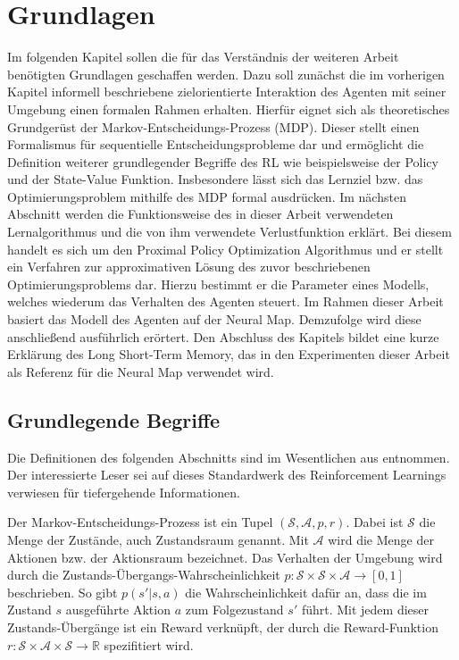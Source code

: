 \chapter{Grundlagen}

Im folgenden Kapitel sollen die für das Verständnis der weiteren Arbeit benötigten Grundlagen geschaffen werden. Dazu soll zunächst die im vorherigen Kapitel informell beschriebene zielorientierte Interaktion des Agenten mit seiner Umgebung einen formalen Rahmen erhalten. Hierfür eignet sich als theoretisches Grundgerüst der Markov-Entscheidungs-Prozess (MDP). Dieser stellt einen Formalismus für sequentielle Entscheidungsprobleme dar und ermöglicht die Definition weiterer grundlegender Begriffe des \ac{RL} wie beispielsweise der Policy und der State-Value Funktion. Insbesondere lässt sich das Lernziel bzw. das Optimierungsproblem mithilfe des MDP formal ausdrücken. Im nächsten Abschnitt werden die Funktionsweise des in dieser Arbeit verwendeten Lernalgorithmus und die von ihm verwendete Verlustfunktion erklärt. Bei diesem handelt es sich um den Proximal Policy Optimization Algorithmus und er stellt ein Verfahren zur approximativen Lösung des zuvor beschriebenen Optimierungsproblems dar. Hierzu bestimmt er die Parameter eines Modells, welches wiederum das Verhalten des Agenten steuert. Im Rahmen dieser Arbeit basiert das Modell des Agenten auf der Neural Map. Demzufolge wird diese anschließend ausführlich erörtert. Den Abschluss des Kapitels bildet eine kurze Erklärung des Long Short-Term Memory, das in den Experimenten dieser Arbeit als Referenz für die Neural Map verwendet wird.


\section{Grundlegende Begriffe}
\label{sec_basics}

Die Definitionen des folgenden Abschnitts sind im Wesentlichen aus \cite{SuttonBarto} entnommen. Der interessierte Leser sei auf dieses Standardwerk des Reinforcement Learnings verwiesen für tiefergehende Informationen.

Der Markov-Entscheidungs-Prozess ist ein Tupel $(\mathcal{S, A}, p, r)$. Dabei ist $\mathcal{S}$ die Menge der Zustände, auch Zustandsraum genannt. Mit $\mathcal{A}$ wird die Menge der Aktionen bzw. der Aktionsraum bezeichnet. Das Verhalten der Umgebung wird durch die Zustands-Übergangs-Wahrscheinlichkeit $p: \mathcal{S} \times \mathcal{S} \times \mathcal{A} \to [0,1]$ beschrieben. So gibt $p(s'|s,a)$ die Wahrscheinlichkeit dafür an, dass die im Zustand $s$ ausgeführte Aktion $a$  zum Folgezustand $s'$ führt. Mit jedem dieser Zustands-Übergänge ist ein Reward verknüpft, der durch die Reward-Funktion $r: \mathcal{S} \times \mathcal{A} \times \mathcal{S} \to \mathbb{R}$ spezifitiert wird.

